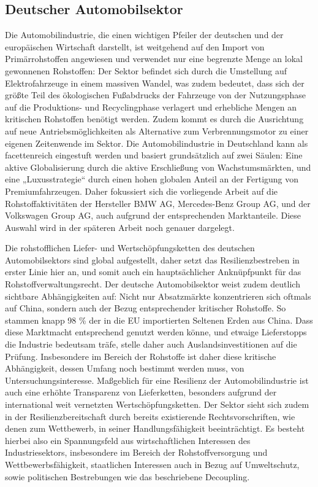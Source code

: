 \documentclass[12pt,a4paper,oneside]{book} %
\begin{document}
\subsection{Deutscher Automobilsektor}
Die Automobilindustrie, die einen wichtigen Pfeiler der deutschen und der europäischen Wirtschaft darstellt, ist weitgehend auf den Import von Primärrohstoffen angewiesen und verwendet nur eine begrenzte Menge an lokal gewonnenen Rohstoffen: Der Sektor befindet sich durch die Umstellung auf Elektrofahrzeuge in einem massiven Wandel, was zudem bedeutet, dass sich der größte Teil des ökologischen Fußabdrucks der Fahrzeuge von der Nutzungsphase auf die Produktions- und Recyclingphase verlagert und erhebliche Mengen an kritischen Rohstoffen benötigt werden. Zudem kommt es durch die Ausrichtung auf neue Antriebsmöglichkeiten als Alternative zum Verbrennungsmotor zu einer eigenen Zeitenwende im Sektor. Die Automobilindustrie in Deutschland kann als facettenreich eingestuft werden und basiert grundsätzlich auf zwei Säulen: Eine aktive Globalisierung durch die aktive Erschließung von Wachstumsmärkten, und eine „Luxusstrategie“ durch einen hohen globalen Anteil an der Fertigung von Premiumfahrzeugen.\autocite[3ff.]{puls_geschaftsmodell_2021} Daher fokussiert sich die vorliegende Arbeit auf die Rohstoffaktivitäten der Hersteller BMW AG, Mercedes-Benz Group AG, und der Volkswagen Group AG, auch aufgrund der entsprechenden Marktanteile. Diese Auswahl wird in der späteren Arbeit noch genauer dargelegt. 

Die rohstofflichen Liefer- und Wertschöpfungsketten des deutschen Automobilsektors sind global aufgestellt, daher setzt das Resilienzbestreben in erster Linie hier an, und somit auch ein hauptsächlicher Anknüpfpunkt für das Rohstoffverwaltungsrecht. Der deutsche Automobilsektor weist zudem deutlich sichtbare Abhängigkeiten auf: Nicht nur Absatzmärkte konzentrieren sich oftmals auf China, sondern auch der Bezug entsprechender kritischer Rohstoffe. So stammen knapp 98 \% der in die EU importierten Seltenen Erden aus China.\autocite[4]{gaus_rare_2021} Dass diese Marktmacht entsprechend genutzt werden könne, und etwaige Lieferstopps die Industrie bedeutsam träfe, stelle daher auch Auslandsinvestitionen auf die Prüfung.\autocite[64]{becker_vom_2023} Insbesondere im Bereich der Rohstoffe ist daher diese kritische Abhängigkeit, dessen Umfang noch bestimmt werden muss, von Untersuchungsinteresse. Maßgeblich für eine Resilienz der Automobilindustrie ist auch eine erhöhte Transparenz von Lieferketten, besonders aufgrund der international weit vernetzten Wertschöpfungsketten.\autocite[9]{kagermann_resilienz_2021} Der Sektor sieht sich zudem in der Resilienzbereitschaft durch bereits existierende Rechtsvorschriften, wie denen zum Wettbewerb, in seiner Handlungsfähigkeit beeinträchtigt.\autocite[19]{kagermann_resilienz_2021} Es besteht hierbei also ein Spannungsfeld aus wirtschaftlichen Interessen des Industriesektors, insbesondere im Bereich der Rohstoffversorgung und Wettbewerbsfähigkeit, staatlichen Interessen auch in Bezug auf Umweltschutz, sowie politischen Bestrebungen wie das beschriebene Decoupling.
\end{document}

